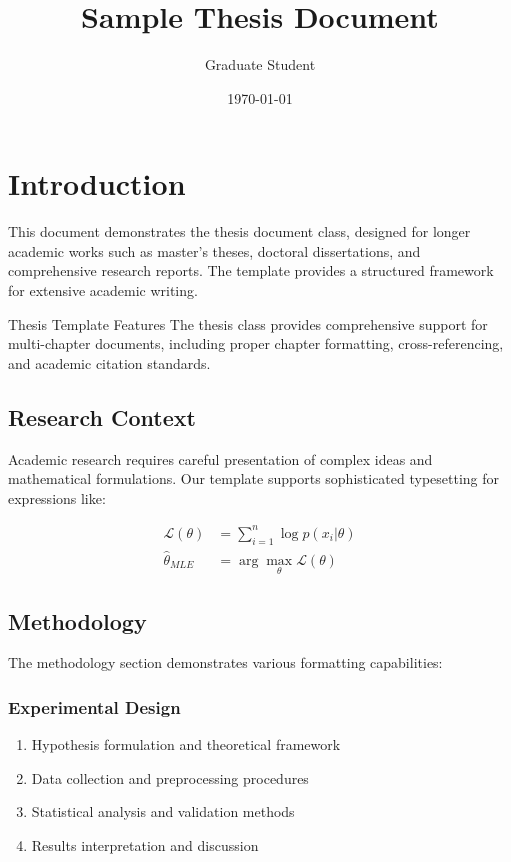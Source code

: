 \documentclass[12pt]{e_class_thesis}
\title{Sample Thesis Document}
\author{Graduate Student}
\date{\today}
\begin{document}
\maketitle
\mytoc

\chapter{Introduction}

This document demonstrates the thesis document class, designed for longer academic works such as master's theses, doctoral dissertations, and comprehensive research reports. The template provides a structured framework for extensive academic writing.

\begin{special_columns}{Thesis Template Features}
    The thesis class provides comprehensive support for multi-chapter documents, including proper chapter formatting, cross-referencing, and academic citation standards.
\end{special_columns}

\section{Research Context}

Academic research requires careful presentation of complex ideas and mathematical formulations. Our template supports sophisticated typesetting for expressions like:

\begin{align}
    \mathcal{L}(\theta) &= \sum_{i=1}^{n} \log p(x_i|\theta) \\
    \hat{\theta}_{MLE} &= \arg\max_{\theta} \mathcal{L}(\theta)
\end{align}

\section{Methodology}

The methodology section demonstrates various formatting capabilities:

\subsection{Experimental Design}
\begin{enumerate}
    \item Hypothesis formulation and theoretical framework
    \item Data collection and preprocessing procedures
    \item Statistical analysis and validation methods
    \item Results interpretation and discussion
\end{enumerate}
\end{document}
